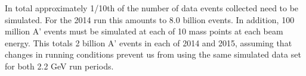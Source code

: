 %
%
In total approximately 1/10th of the number of data events collected need to be simulated. For the 2014 run this amounts to 8.0 billion events.
In addition, 100 million A' events must be simulated at each of 10 mass points at each beam energy. 
This totals 2 billion A' events in each of 2014 and 2015, assuming that changes in running conditions prevent us from using the same simulated data set for both 2.2 GeV run periods.

